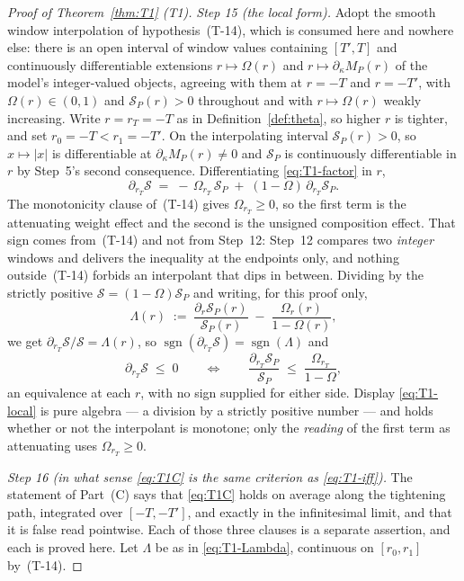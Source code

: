 \begin{proof}[Proof of Theorem~\ref{thm:T1} (T1)]
\emph{Step 15 (the local form).} Adopt the smooth window interpolation of hypothesis~(T-14), which
is consumed here and nowhere else: there is an open interval of window values containing $[T',T]$
and continuously differentiable extensions $r \mapsto \Omega(r)$ and
$r \mapsto \partial_\kappa M_P(r)$ of the model's integer-valued objects, agreeing with them at
$r = -T$ and $r = -T'$, with $\Omega(r) \in (0,1)$ and $\mathcal S_P(r) > 0$ throughout and with
$r \mapsto \Omega(r)$ weakly increasing. Write $r = r_T = -T$ as in Definition~\ref{def:theta}, so
higher $r$ is tighter, and set $r_0 = -T < r_1 = -T'$. On the interpolating interval
$\mathcal S_P(r) > 0$, so $x \mapsto |x|$ is differentiable at $\partial_\kappa M_P(r) \neq 0$ and
$\mathcal S_P$ is continuously differentiable in $r$ by Step~5's second consequence. Differentiating
\eqref{eq:T1-factor} in $r$,
\[
\partial_{r_T}\mathcal S \;=\; -\,\Omega_{r_T}\,\mathcal S_P \;+\; (1-\Omega)\,\partial_{r_T}\mathcal S_P .
\]
The monotonicity clause of~(T-14) gives $\Omega_{r_T} \ge 0$, so the first term is the attenuating
weight effect and the second is the unsigned composition effect. That sign comes from~(T-14) and not
from Step~12: Step~12 compares two \emph{integer} windows and delivers the inequality at the
endpoints only, and nothing outside~(T-14) forbids an interpolant that dips in between. Dividing by
the strictly positive $\mathcal S = (1-\Omega)\mathcal S_P$ and writing, for this proof only,
\begin{equation}
\label{eq:T1-Lambda}
\Lambda(r) \;:=\; \frac{\partial_{r}\mathcal S_P(r)}{\mathcal S_P(r)} \;-\; \frac{\Omega_{r}(r)}{1-\Omega(r)},
\end{equation}
we get $\partial_{r_T}\mathcal S/\mathcal S = \Lambda(r)$, so
$\operatorname{sgn}(\partial_{r_T}\mathcal S) = \operatorname{sgn}(\Lambda)$ and
\begin{equation}
\label{eq:T1-local}
\partial_{r_T}\mathcal S \;\le\; 0
\qquad\Longleftrightarrow\qquad
\frac{\partial_{r_T}\mathcal S_P}{\mathcal S_P} \;\le\; \frac{\Omega_{r_T}}{1-\Omega} ,
\end{equation}
an equivalence at each $r$, with no sign supplied for either side. Display \eqref{eq:T1-local} is
pure algebra --- a division by a strictly positive number --- and holds whether or not the
interpolant is monotone; only the \emph{reading} of the first term as attenuating uses
$\Omega_{r_T} \ge 0$.

\emph{Step 16 (in what sense \eqref{eq:T1C} is the same criterion as \eqref{eq:T1-iff}).} The
statement of Part~(C) says that \eqref{eq:T1C} holds on average along the tightening path,
integrated over $[-T,-T']$, and exactly in the infinitesimal limit, and that it is false read
pointwise. Each of those three clauses is a separate assertion, and each is proved here. Let
$\Lambda$ be as in \eqref{eq:T1-Lambda}, continuous on $[r_0,r_1]$ by~(T-14).


\end{proof}

